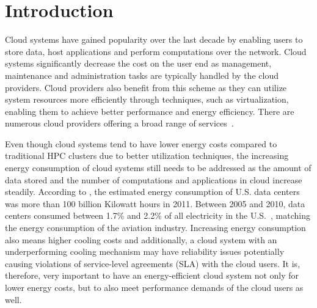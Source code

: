 \documentclass[preprint,12pt]{elsarticle}
\begin{document}

\section{Introduction}
\label{intro}
Cloud systems have gained popularity over the last decade by enabling users to store data, host
applications and perform computations over the network. Cloud systems significantly decrease
the cost on the user end as management, maintenance and administration tasks are typically
handled by the cloud providers. Cloud providers also benefit from this scheme as they can
utilize system resources more efficiently through techniques, such as virtualization, enabling them
to achieve better performance and energy efficiency. There are numerous cloud providers
offering a broad range of services~\cite{googlece, aws, azure}.

Even though cloud systems tend to have lower energy costs compared to traditional HPC clusters
due to better utilization techniques, the increasing energy consumption of cloud systems still
needs to be addressed as the amount of data stored and the number of computations and applications
in cloud increase steadily. According to \cite{Kaushik:2010:LSE:1851476.1851523}, the estimated
energy consumption of U.S. data centers was more than 100 billion Kilowatt hours in 2011.
Between 2005 and 2010, data centers consumed between 1.7\% and 2.2\% of all electricity in the
U.S.~\cite{koomey2011growth}, matching the energy consumption of the aviation industry.
Increasing energy consumption also means higher cooling costs and additionally, a cloud system with an
underperforming cooling mechanism may have reliability issues potentially causing violations of
service-level agreements (SLA) with the cloud users. It is, therefore, very important to have an
energy-efficient cloud system not only for lower energy costs, but to also meet performance
demands of the cloud users as well.
\end{document}
